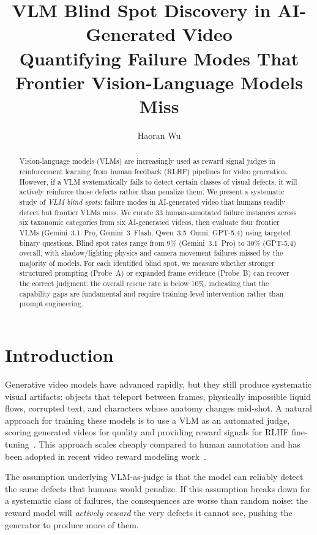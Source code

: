 \documentclass[11pt]{article}
\title{\textbf{VLM Blind Spot Discovery in AI-Generated Video}\\
\large Quantifying Failure Modes That Frontier Vision-Language Models Miss}
\author{Haoran Wu}
\date{}
\begin{document}
\maketitle

\begin{abstract}
Vision-language models (VLMs) are increasingly used as reward signal judges in reinforcement learning from human feedback (RLHF) pipelines for video generation. However, if a VLM systematically fails to detect certain classes of visual defects, it will actively reinforce those defects rather than penalize them. We present a systematic study of \textit{VLM blind spots}: failure modes in AI-generated video that humans readily detect but frontier VLMs miss. We curate 33 human-annotated failure instances across six taxonomic categories from six AI-generated videos, then evaluate four frontier VLMs (Gemini~3.1~Pro, Gemini~3~Flash, Qwen~3.5~Omni, GPT-5.4) using targeted binary questions. Blind spot rates range from 9\% (Gemini~3.1~Pro) to 30\% (GPT-5.4) overall, with shadow/lighting physics and camera movement failures missed by the majority of models. For each identified blind spot, we measure whether stronger structured prompting (Probe~A) or expanded frame evidence (Probe~B) can recover the correct judgment: the overall rescue rate is below 10\%, indicating that the capability gaps are fundamental and require training-level intervention rather than prompt engineering.
\end{abstract}

\section{Introduction}

Generative video models have advanced rapidly, but they still produce systematic visual artifacts: objects that teleport between frames, physically impossible liquid flows, corrupted text, and characters whose anatomy changes mid-shot. A natural approach for training these models is to use a VLM as an automated judge, scoring generated videos for quality and providing reward signals for RLHF fine-tuning~\cite{ouyang2022rlhf}. This approach scales cheaply compared to human annotation and has been adopted in recent video reward modeling work~\cite{he2024videoscore}.

The assumption underlying VLM-as-judge is that the model can reliably detect the same defects that humans would penalize. If this assumption breaks down for a systematic class of failures, the consequences are worse than random noise: the reward model will \textit{actively reward} the very defects it cannot see, pushing the generator to produce more of them.
\end{document}
